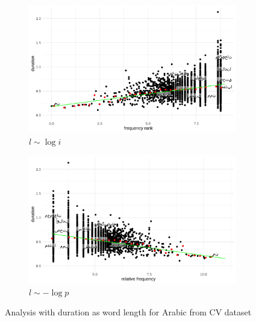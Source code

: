 \begin{figure}[H]
  \centering
  \begin{subfigure}[b]{0.48\textwidth}
    \centering
    \includegraphics[width=\textwidth]{plots/Arabic_logi_d_CV.pdf}
    \caption{$l \sim \log i$}
  \end{subfigure}
  \hfill
  \begin{subfigure}[b]{0.48\textwidth}
    \centering
    \includegraphics[width=\textwidth]{plots/Arabic_logp_d_CV.pdf}
    \caption{$l \sim -\log p$}
  \end{subfigure}
  \caption{Analysis with duration as word length for Arabic from CV dataset}
\end{figure}

